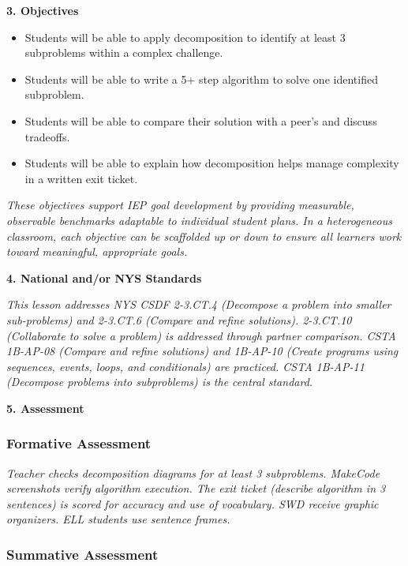 \documentclass[11pt,letterpaper]{article}
\begin{document}
\textbf{3. Objectives}

\begin{itemize}
  \item Students will be able to apply decomposition to identify at least 3 subproblems within a complex challenge.

  \item Students will be able to write a 5+ step algorithm to solve one identified subproblem.

  \item Students will be able to compare their solution with a peer's and discuss tradeoffs.

  \item Students will be able to explain how decomposition helps manage complexity in a written exit ticket.
\end{itemize}

\textit{These objectives support IEP goal development by providing measurable, observable benchmarks adaptable to individual student plans. In a heterogeneous classroom, each objective can be scaffolded up or down to ensure all learners work toward meaningful, appropriate goals.}

\textbf{4. National and/or NYS Standards}

\textit{This lesson addresses NYS CSDF 2-3.CT.4 (Decompose a problem into smaller sub-problems) and 2-3.CT.6 (Compare and refine solutions). 2-3.CT.10 (Collaborate to solve a problem) is addressed through partner comparison. CSTA 1B-AP-08 (Compare and refine solutions) and 1B-AP-10 (Create programs using sequences, events, loops, and conditionals) are practiced. CSTA 1B-AP-11 (Decompose problems into subproblems) is the central standard.}

\newpage
\textbf{5. Assessment}

\subsubsection{Formative Assessment}

\textit{Teacher checks decomposition diagrams for at least 3 subproblems. MakeCode screenshots verify algorithm execution. The exit ticket (describe algorithm in 3 sentences) is scored for accuracy and use of vocabulary. SWD receive graphic organizers. ELL students use sentence frames.}

\subsubsection{Summative Assessment}
\end{document}

